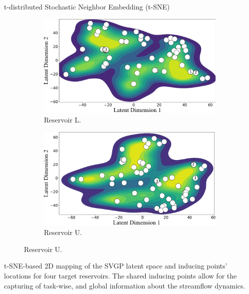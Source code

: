 \begin{frame}{t-distributed Stochastic Neighbor Embedding (t-SNE)}
\begin{figure}[htbp]
		\begin{subfigure}[t]{0.38\columnwidth}
			\centering
			\includegraphics[width=\columnwidth]{chp_sogp/figures/TSNE_task11_kde_p30.png}
			\caption{Reservoir L.}
		\end{subfigure}
		\hspace{0.05\columnwidth} %
		\begin{subfigure}[t]{0.38\columnwidth}
			\centering
			\includegraphics[width=\columnwidth]{chp_sogp/figures/TSNE_task20_kde_p30.png}
			\caption{Reservoir U.}
		\end{subfigure}
		
		\vspace{-1.5em} %
	\end{figure}
	\begin{block}{}
	t-SNE-based 2D mapping of the SVGP latent space and inducing points' locations for four target reservoirs. The shared inducing points allow for the capturing of task-wise, and global information about the streamflow dynamics.
	\end{block}
\end{frame}


